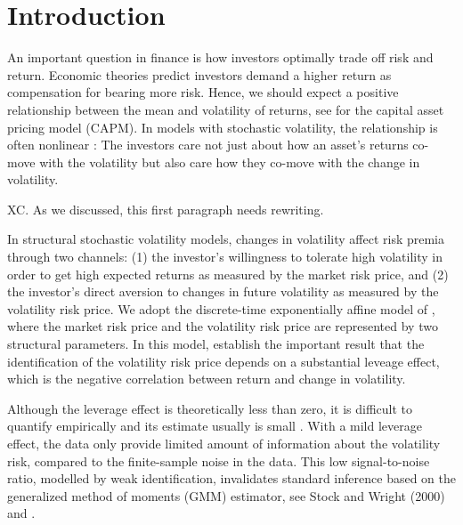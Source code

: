 \documentclass[11pt, letterpaper, twoside]{article}
\begin{document}
\clearpage

\section{Introduction}

An important question in finance is how investors optimally trade off risk and return. Economic theories predict investors demand a higher return as compensation for bearing more risk. Hence, we should expect a positive relationship between the mean and volatility of returns, see  for the capital asset pricing model (CAPM).  %
In models with stochastic volatility, the relationship is often nonlinear \parencites{bansal2014volatility, dewbecker2017price}: %
The investors care not just about how an asset's returns co-move with the volatility but also care how they co-move with the change in volatility. %

XC. As we discussed, this first paragraph needs rewriting.

In structural stochastic volatility models, changes in volatility affect risk premia through two channels: (1) the investor's willingness to tolerate high volatility in order to get high expected returns as measured by the market risk price, and (2) the investor’s direct aversion to changes in future volatility as measured by the volatility risk price. We adopt the discrete-time exponentially affine model of \textcite{han2018leverage}, where the market risk price and the volatility risk price are represented by two structural parameters. In this model,  \textcite{han2018leverage} establish the important result that the identification of the volatility risk price depends on a substantial leveage effect, which is the negative correlation between return and change in volatility. 

Although the leverage effect is theoretically less than zero, it is difficult to quantify empirically and its estimate usually is small \parencites{aitsahalia2013leverage}. With a mild leverage effect, the data only provide limited amount of information about the volatility risk, compared to the finite-sample noise in the data. This low signal-to-noise ratio,  modelled by weak identification, invalidates standard inference based on the generalized method of moments (GMM) estimator, see Stock and Wright (2000) and \textcite{andrews2012estimation}.
\end{document}
